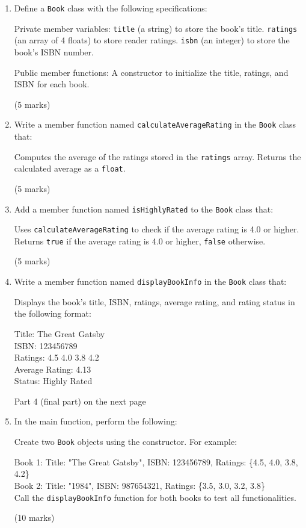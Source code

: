 \documentclass[a4paper,12pt]{article}
\begin{document}
\begin{enumerate}
    \item Define a \verb|Book| class with the following specifications:

    Private member variables:
        \verb|title| (a string) to store the book’s title.
        \verb|ratings| (an array of 4 floats) to store reader ratings.
        \verb|isbn| (an integer) to store the book’s ISBN number.

    Public member functions:
        A constructor to initialize the title, ratings, and ISBN for each book.

    (5 marks)

    \item Write a member function named \verb|calculateAverageRating| in the \verb|Book| class that:

    Computes the average of the ratings stored in the \verb|ratings| array.
    Returns the calculated average as a \verb|float|.

    (5 marks)

    \item Add a member function named \verb|isHighlyRated| to the \verb|Book| class that:

    Uses \verb|calculateAverageRating| to check if the average rating is 4.0 or higher.
    Returns \verb|true| if the average rating is 4.0 or higher, \verb|false| otherwise.

    (5 marks)

    \item Write a member function named \verb|displayBookInfo| in the \verb|Book| class that:

    Displays the book’s title, ISBN, ratings, average rating, and rating status in the following format:

    Title: The Great Gatsby\\
    ISBN: 123456789\\
    Ratings: 4.5 4.0 3.8 4.2\\
    Average Rating: 4.13\\
    Status: Highly Rated\\

    \begin{center}
        Part 4 (final part) on the next page
    \end{center}

    \newpage

    \item In the main function, perform the following:

    Create two \verb|Book| objects using the constructor. For example:
    
    Book 1: Title: "The Great Gatsby", ISBN: 123456789, Ratings: \{4.5, 4.0, 3.8, 4.2\}\\
    Book 2: Title: "1984", ISBN: 987654321, Ratings: \{3.5, 3.0, 3.2, 3.8\}\\

    Call the \verb|displayBookInfo| function for both books to test all functionalities.

    (10 marks)
\end{enumerate}
\vfill
\end{document}
